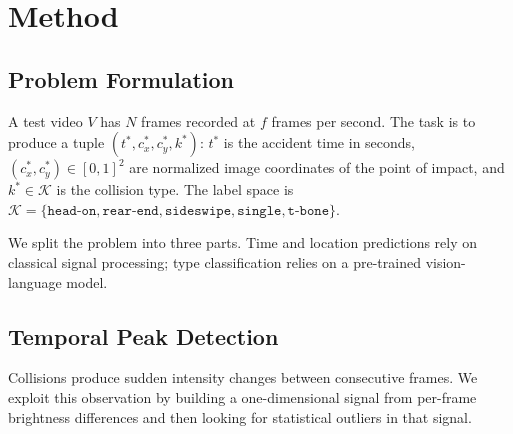 \section{Method}
\label{sec:method}

\subsection{Problem Formulation}

A test video $V$ has $N$ frames recorded at $f$ frames per second. The task is to produce a tuple $(t^{*}, c_x^{*}, c_y^{*}, k^{*})$: $t^{*}$ is the accident time in seconds, $(c_x^{*}, c_y^{*}) \in [0, 1]^{2}$ are normalized image coordinates of the point of impact, and $k^{*} \in \mathcal{K}$ is the collision type. The label space is $\mathcal{K} = \{\texttt{head-on}, \texttt{rear-end}, \texttt{sideswipe}, \texttt{single}, \texttt{t-bone}\}$.

We split the problem into three parts. Time and location predictions rely on classical signal processing; type classification relies on a pre-trained vision-language model.

\subsection{Temporal Peak Detection}

Collisions produce sudden intensity changes between consecutive frames. We exploit this observation by building a one-dimensional signal from per-frame brightness differences and then looking for statistical outliers in that signal.

